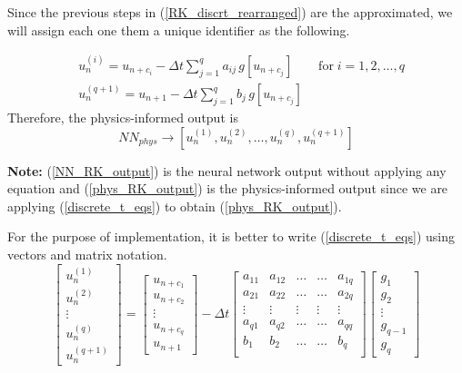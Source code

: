 \documentclass[a4paper,12pt]{article}
\theoremstyle{definition}
\begin{document}
Since the previous steps in (\ref{RK_discrt_rearranged}) are the approximated, we will assign each one 
them a unique identifier as the following.

\begin{equation}\label{discrete_t_eqs}
\begin{aligned}
& u_n^{(i)} = u_{n+c_i} -  \Delta t \sum_{j=1}^{q} a_{ij} \, g[u_{n+c_j}] 
\qquad \text{for} \; i = 1, 2, \dots, q \\
& u_n^{(q+1)} = u_{n+1} - \Delta t \sum_{j=1}^{q} b_j \, g[u_{n+c_j}] 
\end{aligned}
\end{equation}
Therefore, the physics-informed output is 
\begin{equation}\label{phys_RK_output}
NN_{phys} \rightarrow [u_{n}^{(1)}, u_n^{(2)}, \dots, u_n^{(q)}, u_n^{(q+1)}]
\end{equation}

\textbf{Note:} (\ref{NN_RK_output}) is the neural network output without applying any equation 
and (\ref{phys_RK_output}) is the physics-informed output since we are applying (\ref{discrete_t_eqs})
to obtain (\ref{phys_RK_output}). 

For the purpose of implementation, it is better to write (\ref{discrete_t_eqs}) using vectors and 
matrix notation.
\begin{equation}
\begin{bmatrix}
    u_{n}^{(1)} \\ u_n^{(2)} \\ \vdots \\ u_n^{(q)} \\ u_n^{(q+1)}   
\end{bmatrix}
=
\begin{bmatrix}
u_{n+c_1} \\ u_{n+c_2} \\ \vdots \\ u_{n+c_q} \\ u_{n+1}
\end{bmatrix}
-
\Delta t
\begin{bmatrix}
    a_{11} & a_{12} & \dots & \dots & a_{1q} \\
    a_{21} & a_{22} & \dots & \dots & a_{2q} \\
    \vdots & \vdots & \vdots & \vdots & \vdots \\
    a_{q1} & a_{q2} & \dots & \dots & a_{qq} \\
    b_{1} & b_{2} & \dots & \dots & b_{q} \\
\end{bmatrix}
\begin{bmatrix}
g_1 \\ g_2 \\ \vdots \\ g_{q-1} \\ g_{q}
\end{bmatrix}
\end{equation}
\end{document}
